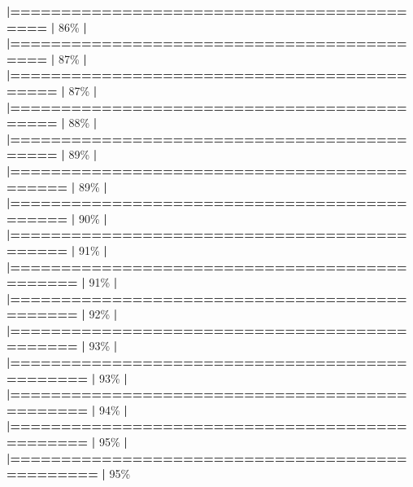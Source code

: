 \documentclass[
]{book}
\newenvironment{Shaded}{\begin{snugshade}}{\end{snugshade}}
\newcommand{\DecValTok}[1]{\textcolor[rgb]{0.00,0.00,0.81}{#1}}
\newcommand{\ErrorTok}[1]{\textcolor[rgb]{0.64,0.00,0.00}{\textbf{#1}}}
\newcommand{\NormalTok}[1]{#1}
\newcommand{\SpecialCharTok}[1]{\textcolor[rgb]{0.81,0.36,0.00}{\textbf{#1}}}
\begin{document}
\begin{Shaded}
\begin{Highlighting}[]
  \ErrorTok{|===========================================}       \ErrorTok{|}  \DecValTok{86}\NormalTok{\%}
  \SpecialCharTok{|}                                                        
  \ErrorTok{|===========================================}       \ErrorTok{|}  \DecValTok{87}\NormalTok{\%}
  \SpecialCharTok{|}                                                        
  \ErrorTok{|============================================}      \ErrorTok{|}  \DecValTok{87}\NormalTok{\%}
  \SpecialCharTok{|}                                                        
  \ErrorTok{|============================================}      \ErrorTok{|}  \DecValTok{88}\NormalTok{\%}
  \SpecialCharTok{|}                                                        
  \ErrorTok{|============================================}      \ErrorTok{|}  \DecValTok{89}\NormalTok{\%}
  \SpecialCharTok{|}                                                        
  \ErrorTok{|=============================================}     \ErrorTok{|}  \DecValTok{89}\NormalTok{\%}
  \SpecialCharTok{|}                                                        
  \ErrorTok{|=============================================}     \ErrorTok{|}  \DecValTok{90}\NormalTok{\%}
  \SpecialCharTok{|}                                                        
  \ErrorTok{|=============================================}     \ErrorTok{|}  \DecValTok{91}\NormalTok{\%}
  \SpecialCharTok{|}                                                        
  \ErrorTok{|==============================================}    \ErrorTok{|}  \DecValTok{91}\NormalTok{\%}
  \SpecialCharTok{|}                                                        
  \ErrorTok{|==============================================}    \ErrorTok{|}  \DecValTok{92}\NormalTok{\%}
  \SpecialCharTok{|}                                                        
  \ErrorTok{|==============================================}    \ErrorTok{|}  \DecValTok{93}\NormalTok{\%}
  \SpecialCharTok{|}                                                        
  \ErrorTok{|===============================================}   \ErrorTok{|}  \DecValTok{93}\NormalTok{\%}
  \SpecialCharTok{|}                                                        
  \ErrorTok{|===============================================}   \ErrorTok{|}  \DecValTok{94}\NormalTok{\%}
  \SpecialCharTok{|}                                                        
  \ErrorTok{|===============================================}   \ErrorTok{|}  \DecValTok{95}\NormalTok{\%}
  \SpecialCharTok{|}                                                        
  \ErrorTok{|================================================}  \ErrorTok{|}  \DecValTok{95}\NormalTok{\%}

\end{Highlighting}
\end{Shaded}
\end{document}
